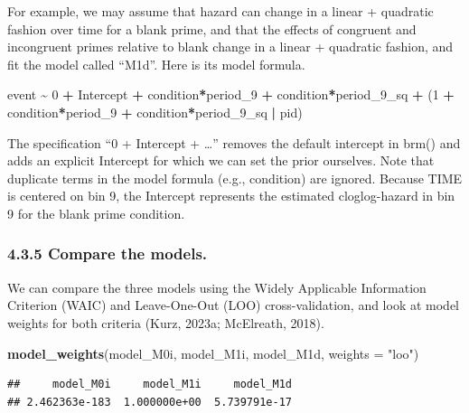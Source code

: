 \documentclass[
  man, donotrepeattitle,floatsintext]{apa6}
\newenvironment{Shaded}{\begin{snugshade}}{\end{snugshade}}
\newcommand{\AttributeTok}[1]{\textcolor[rgb]{0.13,0.29,0.53}{#1}}
\newcommand{\DecValTok}[1]{\textcolor[rgb]{0.00,0.00,0.81}{#1}}
\newcommand{\FunctionTok}[1]{\textcolor[rgb]{0.13,0.29,0.53}{\textbf{#1}}}
\newcommand{\NormalTok}[1]{#1}
\newcommand{\SpecialCharTok}[1]{\textcolor[rgb]{0.81,0.36,0.00}{\textbf{#1}}}
\newcommand{\StringTok}[1]{\textcolor[rgb]{0.31,0.60,0.02}{#1}}
\begin{document}
For example, we may assume that hazard can change in a linear + quadratic fashion over time for a blank prime, and that the effects of congruent and incongruent primes relative to blank change in a linear + quadratic fashion, and fit the model called ``M1d''. Here is its model formula.

\begin{Shaded}
\begin{Highlighting}[]
\NormalTok{event }\SpecialCharTok{\textasciitilde{}} \DecValTok{0} \SpecialCharTok{+}\NormalTok{ Intercept }\SpecialCharTok{+}\NormalTok{ condition}\SpecialCharTok{*}\NormalTok{period\_9 }\SpecialCharTok{+}\NormalTok{ condition}\SpecialCharTok{*}\NormalTok{period\_9\_sq }\SpecialCharTok{+} 
\NormalTok{                   (}\DecValTok{1} \SpecialCharTok{+}\NormalTok{ condition}\SpecialCharTok{*}\NormalTok{period\_9 }\SpecialCharTok{+}\NormalTok{ condition}\SpecialCharTok{*}\NormalTok{period\_9\_sq }\SpecialCharTok{|}\NormalTok{ pid)}
\end{Highlighting}
\end{Shaded}

The specification ``0 + Intercept + \ldots{}'' removes the default intercept in brm() and adds an explicit Intercept for which we can set the prior ourselves. Note that duplicate terms in the model formula (e.g., condition) are ignored.
Because TIME is centered on bin 9, the Intercept represents the estimated cloglog-hazard in bin 9 for the blank prime condition.

\subsubsection{4.3.5 Compare the models.}\label{compare-the-models.}

We can compare the three models using the Widely Applicable Information Criterion (WAIC) and Leave-One-Out (LOO) cross-validation, and look at model weights for both criteria (Kurz, 2023a; McElreath, 2018).

\begin{Shaded}
\begin{Highlighting}[]
\FunctionTok{model\_weights}\NormalTok{(model\_M0i, model\_M1i, model\_M1d, }\AttributeTok{weights =} \StringTok{"loo"}\NormalTok{) }
\end{Highlighting}
\end{Shaded}

\begin{verbatim}
##     model_M0i     model_M1i     model_M1d 
## 2.462363e-183  1.000000e+00  5.739791e-17
\end{verbatim}
\end{document}
